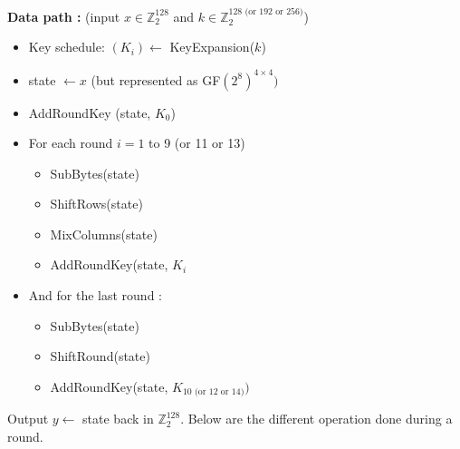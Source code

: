 \documentclass[11pt,a4paper]{report}
\begin{document}
\textbf{Data path :} (input $x \in \mathbb{Z}_2^{128}$ and $k \in \mathbb{Z}_2^{128 \text{ (or 192 or 256)}}$)
\begin{itemize}
\item Key schedule: $(K_i) \leftarrow $ KeyExpansion($k$)
\item state $\leftarrow x$ (but represented as GF$(2^8)^{4\times 4})$
\item AddRoundKey (state, $K_0$)
\item For each round $i = 1$ to 9 (or 11 or 13)
\begin{itemize}
\item SubBytes(state)
\item ShiftRows(state)
\item MixColumns(state)
\item AddRoundKey(state, $K_i$
\end{itemize}
\item And for the last round :
\begin{itemize}
\item SubBytes(state)
\item ShiftRound(state)
\item AddRoundKey(state, $K_{10\text{ (or 12 or 14)}})$
\end{itemize}
\end{itemize}
Output $y \leftarrow$ state back in $\mathbb{Z}_2^{128}$. Below are the different operation done during a round.
\end{document}

